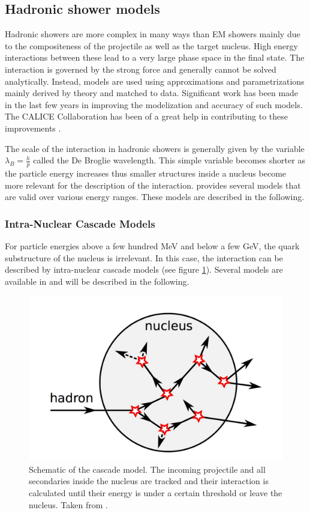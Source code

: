 \subsection{Hadronic shower models}

Hadronic showers are more complex in many ways than EM showers mainly due to the compositeness of the projectile as well as the target nucleus. High energy interactions between these lead to a very large phase space in the final state. The interaction is governed by the strong force and generally cannot be solved analytically. Instead, models are used using approximations and parametrizations mainly derived by theory and matched to data. Significant work has been made in the last few years in improving the modelization and accuracy of such models. The CALICE Collaboration has been of a great help in contributing to these improvements \cite{Adloff2013, Bilki2015}.

The scale of the interaction in hadronic showers is generally given by the variable $\lambda_{B} = \frac{h}{p}$ called the De Broglie wavelength. This simple variable becomes shorter as the particle energy increases thus smaller structures inside a nucleus become more relevant for the description of the interaction. \geant provides several models that are valid over various energy ranges. These models are described in the following.

\subsubsection{Intra-Nuclear Cascade Models}

For particle energies above a few hundred MeV and below a few GeV, the quark substructure of the nucleus is irrelevant. In this case, the interaction can be described by intra-nuclear cascade models (see figure \ref{fig:cascademodel}). Several models are available in \geant and will be described in the following.\\

\begin{figure}[htbp!]
  \centering
  \includegraphics[width=0.5\linewidth]{chap4/fig/CascadeModel.jpeg}
  \caption{Schematic of the cascade model. The incoming projectile and all secondaries inside the nucleus are tracked and their interaction is calculated until their energy is under a certain threshold or leave the nucleus. Taken from \cite{Feege2011}.} \label{fig:cascademodel}
\end{figure}

